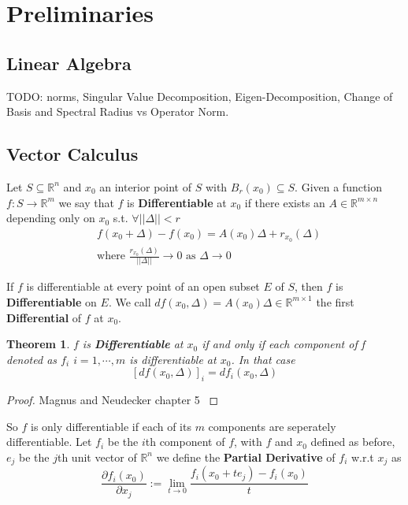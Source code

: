 \documentclass[]{article}
\theoremstyle{mattstyle}
\newtheorem{theorem}{Theorem}[section]
\theoremstyle{definition}
\begin{document}
\newpage

\section{Preliminaries}

\subsection{Linear Algebra}

TODO: norms, Singular Value Decomposition, Eigen-Decomposition, Change of Basis and Spectral Radius vs Operator Norm.

\subsection{Vector Calculus}

Let $S \subseteq \mathbb{R}^n$ and $x_0$ an interior point of $S$ with $B_r(x_0) \subseteq S$. Given a function $f: S \rightarrow \mathbb{R}^m$ we say that $f$ is \textbf{Differentiable} at $x_0$ if there exists an $A \in \mathbb{R}^{m \times n}$ depending only on $x_0$ s.t. $\forall ||\Delta|| < r$
\begin{align*}
&f(x_0 + \Delta) - f(x_0) = A(x_0)\Delta + r_{x_0}(\Delta)\\
&\text{where $\frac{r_{x_0}(\Delta)}{||\Delta||}\rightarrow 0$ as $\Delta \rightarrow 0$}
\end{align*}

If $f$ is differentiable at every point of an open subset $E$ of $S$, then $f$ is \textbf{Differentiable} on $E$. We call $df(x_0, \Delta) = A(x_0)\Delta \in \mathbb{R}^{m \times 1}$ the first \textbf{Differential} of $f$ at $x_0$.

\begin{theorem}
	$f$ is \textbf{Differentiable} at $x_0$ if and only if each component of f denoted as $f_i$ $i=1,\cdots, m$ is differentiable at $x_0$. In that case $$[df(x_0, \Delta)]_i = df_i(x_0, \Delta)$$
\end{theorem}
\begin{proof}
	Magnus and Neudecker chapter 5 \cite{magnus1988matrix}
\end{proof}

So $f$ is only differentiable if each of its $m$ components are seperately differentiable. Let $f_i$ be the $i$th component of $f$, with $f$ and $x_0$ defined as before, $e_j$ be the $j$th unit vector of $\mathbb{R}^n$ we define the \textbf{Partial Derivative} of $f_i$ w.r.t $x_j$ as
$$
\frac{\partial f_i(x_0)}{\partial x_j} := \lim\limits_{t \rightarrow 0} \frac{f_i(x_0+te_j) - f_i(x_0)}{t}
$$
\end{document}
